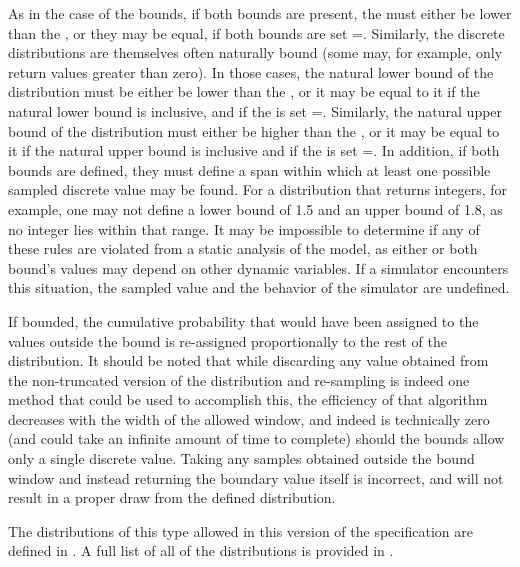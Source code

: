 As in the case of the \ContinuousUnivariateDistribution bounds, if both bounds are present, the  must either be lower than the , or they may be equal, if both bounds are set =.  Similarly, the discrete distributions are themselves often naturally bound (some may, for example, only return values greater than zero).  In those cases, the natural lower bound of the distribution must be either be lower than the , or it may be equal to it if the natural lower bound is inclusive, and if the  is set =.  Similarly, the natural upper bound of the distribution must either be higher than the , or it may be equal to it if the natural upper bound is inclusive and if the  is set =.  In addition, if both bounds are defined, they must define a span within which at least one possible sampled discrete value may be found.  For a distribution that returns integers, for example, one may not define a lower bound of 1.5 and an upper bound of 1.8, as no integer lies within that range.  It may be impossible to determine if any of these rules are violated from a static analysis of the model, as either or both bound's values may depend on other dynamic variables.  If a simulator encounters this situation, the sampled value and the behavior of the simulator are undefined.

If bounded, the cumulative probability that would have been assigned to the values outside the bound is re-assigned proportionally to the rest of the distribution.  It should be noted that while discarding any value obtained from the non-truncated version of the distribution and re-sampling is indeed one method that could be used to accomplish this, the efficiency of that algorithm decreases with the width of the allowed window, and indeed is technically zero (and could take an infinite amount of time to complete) should the bounds allow only a single discrete value.  Taking any samples obtained outside the bound window and instead returning the boundary value itself is incorrect, and will not result in a proper draw from the defined distribution.

The distributions of this type allowed in this version of the specification are defined in .  A full list of all of the distributions is provided in .




